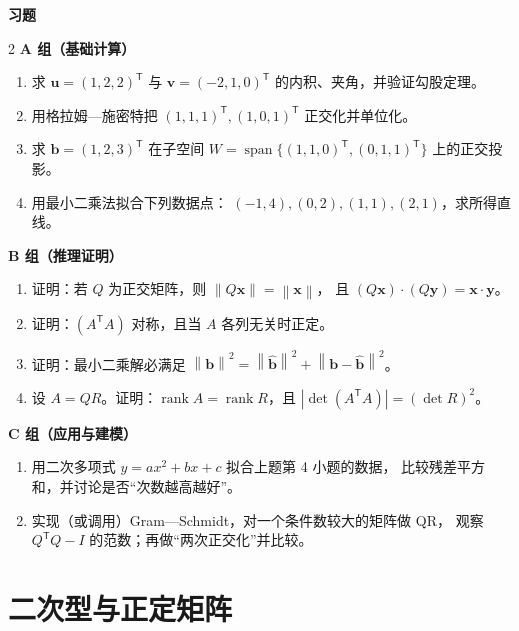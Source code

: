 \documentclass[11pt,a4paper,openany]{ctexbook}
\DeclareMathOperator{\rank}{rank}
\DeclareMathOperator{\Span}{span}
\newcommand{\norm}[1]{\left\lVert #1 \right\rVert}
\newcommand{\abs}[1]{\left\lvert #1 \right\rvert}
\newcommand{\exhead}{%
  \par\addvspace{12pt}%
  {\noindent\sffamily\bfseries\Large\color{qing} 习题\par}%
  \vspace{-4pt}\noindent{\color{qing!32}\rule{\linewidth}{0.7pt}}\par\vspace{6pt}}
\begin{document}
\exhead
\begin{multicols}{2}
\small
\textbf{A 组（基础计算）}
\begin{enumerate}[leftmargin=1.6em, itemsep=3pt]
\item 求 $\boldsymbol{u}=(1,2,2)^{\mathsf T}$ 与
      $\boldsymbol{v}=(-2,1,0)^{\mathsf T}$ 的内积、夹角，并验证勾股定理。
\item 用格拉姆—施密特把 $(1,1,1)^{\mathsf T},(1,0,1)^{\mathsf T}$ 正交化并单位化。
\item 求 $\boldsymbol{b}=(1,2,3)^{\mathsf T}$ 在子空间
      $W=\Span\{(1,1,0)^{\mathsf T},(0,1,1)^{\mathsf T}\}$
      上的正交投影。
\item 用最小二乘法拟合下列数据点：
      $(-1,4),(0,2),(1,1),(2,1)$，求所得直线。
\end{enumerate}
\textbf{B 组（推理证明）}
\begin{enumerate}[leftmargin=1.6em, itemsep=3pt, start=5]
\item 证明：若 $Q$ 为正交矩阵，则 $\norm{Q\boldsymbol{x}}=\norm{\boldsymbol{x}}$，
      且 $(Q\boldsymbol{x})\cdot(Q\boldsymbol{y})=\boldsymbol{x}\cdot\boldsymbol{y}$。
\item 证明：$(A^{\mathsf T}A)$ 对称，且当 $A$ 各列无关时正定。
\item 证明：最小二乘解必满足 $\norm{\boldsymbol{b}}^2
      =\norm{\widehat{\boldsymbol{b}}}^2+\norm{\boldsymbol{b}-\widehat{\boldsymbol{b}}}^2$。
\item 设 $A=QR$。证明：$\rank A=\rank R$，且 $\abs{\det(A^{\mathsf T}A)}
      =(\det R)^2$。
\end{enumerate}
\textbf{C 组（应用与建模）}
\begin{enumerate}[leftmargin=1.6em, itemsep=3pt, start=9]
\item 用二次多项式 $y=ax^2+bx+c$ 拟合上题第 4 小题的数据，
      比较残差平方和，并讨论是否“次数越高越好”。
\item 实现（或调用）Gram—Schmidt，对一个条件数较大的矩阵做 QR，
      观察 $Q^{\mathsf T}Q-I$ 的范数；再做“两次正交化”并比较。
\end{enumerate}
\end{multicols}

\chapter{二次型与正定矩阵}
\label{ch:quad}
\end{document}

